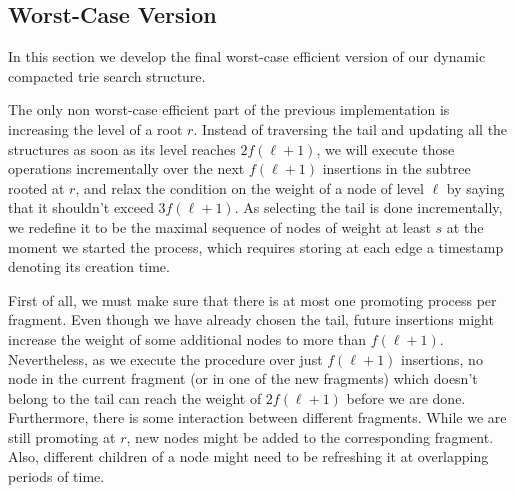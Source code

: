 \documentclass[11pt,onecolumn,final]{article} \usepackage{a4}
\theoremstyle{plain}
\theoremstyle{remark}
\begin{document}
\subsection{Worst-Case Version}

In this section we develop the final worst-case efficient version of our dynamic compacted trie search structure.

The only non worst-case efficient part of the previous implementation is increasing the level of a root $r$. Instead of traversing the tail and updating all the structures as soon as its level reaches $2f(\ell+1)$, we will execute those operations incrementally over the next $f(\ell+1)$ insertions in the subtree rooted at $r$, and relax the condition on the weight of a node of level $\ell$ by saying that it shouldn't exceed $3f(\ell+1)$. As selecting the tail is done incrementally, we redefine it to be the maximal sequence of nodes of weight at least $s$ at the moment we started the process, which requires storing at each edge a timestamp denoting its creation time.

First of all, we must make sure that there is at most one promoting process per fragment. Even though we have already chosen the tail, future insertions might increase the weight of some additional nodes to more than $f(\ell+1)$. Nevertheless, as we execute the procedure over just $f(\ell+1)$ insertions, no node in the current fragment (or in one of the new fragments) which doesn't belong to the tail can reach the weight of $2f(\ell+1)$ before we are done. Furthermore, there is some interaction between different fragments. While we are still promoting at $r$, new nodes might be added to the corresponding fragment. Also, different children of a node might need to be refreshing it at overlapping periods of time.
\end{document}
